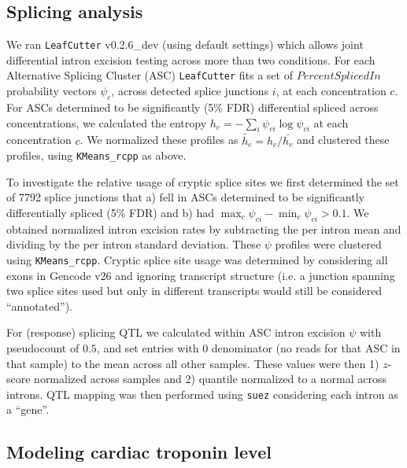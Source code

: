 \documentclass[9pt,lineno]{elife}
\begin{document}
\subsection*{Splicing analysis}

We ran \texttt{LeafCutter} v0.2.6\_dev (using default settings) which allows joint differential intron excision testing across more than two conditions. For each Alternative Splicing Cluster (ASC) \texttt{LeafCutter} fits a set of $Percent Spliced In$ probability vectors $\psi_{c}$, across detected splice junctions $i$, at each concentration $c$. For ASCs determined to be significantly (5\% FDR) differential spliced across concentrations, we calculated the entropy $h_c = -\sum_i \psi_{ci} \log \psi_{ci}$ at each concentration $c$. We normalized these profiles as $\tilde{h_c} = h_c / \bar{h_c}$ and clustered these profiles, using \texttt{KMeans\_rcpp} as above. 

To investigate the relative usage of cryptic splice sites we first determined the set of 7792 splice junctions that a) fell in ASCs determined to be significantly differentially spliced (5\% FDR) and b) had $\max_c \psi_{ci} - \min_c \psi_{ci} > 0.1$. We obtained normalized intron excision rates by subtracting the per intron mean and dividing by the per intron standard deviation. These $\psi$ profiles were clustered using \texttt{KMeans\_rcpp}. Cryptic splice site usage was determined by considering all exons in Gencode v26 and ignoring transcript structure (i.e. a junction spanning two splice sites used but only in different transcripts would still be considered ``annotated''). 

For (response) splicing QTL we calculated within ASC intron excision $\psi$ with pseudocount of $0.5$, and set entries with $0$ denominator (no reads for that ASC in that sample) to the mean across all other samples. These values were then 1) $z$-score normalized across samples and 2) quantile normalized to a normal across introns. QTL mapping was then performed using \texttt{suez} considering each intron as a ``gene''. 

\subsection*{Modeling cardiac troponin level}
\end{document}
